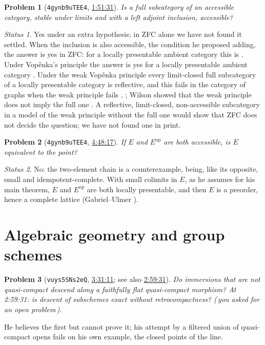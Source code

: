 \documentclass[11pt,a4paper]{amsart}
\newtheorem{problem}{Problem}
\theoremstyle{definition}
\theoremstyle{remark}
\newtheorem*{status}{Status}
\newcommand{\q}[1]{\guillemotleft\,#1\,\guillemotright}
\newcommand{\ts}[3]{\href{https://www.youtube.com/watch?v=#1&t=#2}{#3}}
\begin{document}
\begin{problem}[\texttt{4gynb9uTEE4}, \ts{4gynb9uTEE4}{1h51m31s}{1:51:31}]\label{p:reflective}
Is a full subcategory of an accessible category, stable under limits and with a left adjoint inclusion, accessible?
\end{problem}
\begin{status}
Yes under an extra hypothesis; in ZFC alone we have not found it settled. When the inclusion is also accessible, the condition he proposed adding, the answer is yes in ZFC: for a locally presentable ambient category this is \cite[2.78]{ar}. Under Vop\v{e}nka's principle the answer is yes for a locally presentable ambient category \cite[ch.~6]{ar}. Under the weak Vop\v{e}nka principle every limit-closed full subcategory of a locally presentable category is reflective, and this fails in the category of graphs when the weak principle fails \cite{art}, \cite[6.22]{ar}; Wilson showed that the weak principle does not imply the full one \cite{wilson}. A reflective, limit-closed, non-accessible subcategory in a model of the weak principle without the full one would show that ZFC does not decide the question; we have not found one in print.
\end{status}

\begin{problem}[\texttt{4gynb9uTEE4}, \ts{4gynb9uTEE4}{4h48m17s}{4:48:17}]\label{p:dual}
If $E$ and $E^{\mathrm{op}}$ are both accessible, is $E$ equivalent to the point?
\end{problem}
\begin{status}
No: the two-element chain is a counterexample, being, like its opposite, small and idempotent-complete. With small colimits in $E$, as he assumes for his main theorem, $E$ and $E^{\mathrm{op}}$ are both locally presentable, and then $E$ is a preorder, hence a complete lattice (Gabriel--Ulmer \cite[Satz~7.13]{gu}).
\end{status}

\section{Algebraic geometry and group schemes}

\begin{problem}[\texttt{vuys5SNs2eQ}, \ts{vuys5SNs2eQ}{3h31m11s}{3:31:11}; see also \ts{vuys5SNs2eQ}{2h59m31s}{2:59:31}]\label{p:immersion}
Do immersions that are not quasi-compact descend along a faithfully flat quasi-compact morphism? At 2:59:31: is descent of subschemes exact without retrocompactness? (\q{you asked for an open problem}).
\end{problem}
He believes the first but cannot prove it; his attempt by a filtered union of quasi-compact opens fails on his own example, the closed points of the line.
\end{document}
